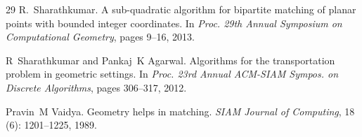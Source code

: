 \documentclass[11pt,onecolumn]{article}
\begin{document}
\begin{thebibliography}{29}
R.~Sharathkumar.
\newblock A sub-quadratic algorithm for bipartite matching of planar points with bounded integer coordinates.
\newblock In \emph{Proc. 29th Annual Symposium on Computational Geometry}, pages 9--16, 2013.

R~Sharathkumar and Pankaj~K Agarwal.
\newblock Algorithms for the transportation problem in geometric settings.
\newblock In \emph{Proc. 23rd Annual {ACM-SIAM} Sympos. on Discrete Algorithms}, pages 306--317, 2012.

Pravin~M Vaidya.
\newblock Geometry helps in matching.
\newblock \emph{SIAM Journal of Computing}, 18 (6): 1201--1225, 1989.

\end{thebibliography}
\end{document}
